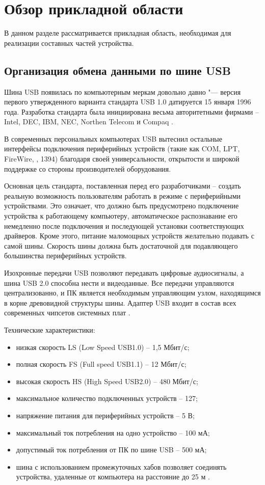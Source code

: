\chapter{Обзор прикладной области}
\label{cha:analysis}

В данном разделе рассматривается прикладная область, необходимая для реализации составных частей устройства.

\section{Организация обмена данными по шине USB}


Шина USB появилась по компьютерным меркам довольно давно "--- версия первого утвержденного варианта стандарта USB 1.0 датируется 15 января 1996 года. Разработка стандарта была инициирована весьма авторитетными фирмами – Intel, DEC, IBM, NEC, Northen Telecom и Compaq \cite{usb:analyse}.

В современных персональных компьютерах USB вытеснил остальные интерфейсы подключения периферийных устройств (такие как COM, LPT, FireWire, , 1394) благодаря своей универсальности, открытости и широкой поддержке со стороны производителей оборудования.

Основная цель стандарта, поставленная перед его разработчиками – создать реальную возможность пользователям работать в режиме  с периферийными устройствами. Это означает, что должно быть предусмотрено подключение устройства к работающему компьютеру, автоматическое распознавание его немедленно после подключения и последующей установки соответствующих драйверов. Кроме этого, питание маломощных устройств желательно подавать с самой шины. Скорость шины должна быть достаточной для подавляющего большинства периферийных устройств.

Изохронные передачи USB позволяют передавать цифровые аудиосигналы, а шина USB 2.0 способна нести и видеоданные. Все передачи управляются централизованно, и ПК является необходимым управляющим узлом, находящимся в корне древовидной структуры шины. Адаптер USB входит в состав всех современных чипсетов системных плат \cite{usb:analyse}.

\pagebreak
Технические характеристики:

\begin{itemize}
\item низкая скорость LS (Low Speed USB1.0) – 1,5 Мбит/с;
\item полная скорость FS (Full speed USB1.1) – 12 Мбит/с;
\item высокая скорость HS (High Speed USB2.0) – 480 Мбит/с;
\item максимальное количество подключенных устройств – 127;
\item напряжение питания для периферийных устройств – 5 В;
\item максимальный ток потребления на одно устройство – 100 мА;
\item допустимый ток потребления от ПК по шине USB – 500 мА;
\item шина с использованием промежуточных хабов позволяет соединять устройства, удаленные от компьютера на расстояние до 25 м \cite{usb:specification}.
\end{itemize}


